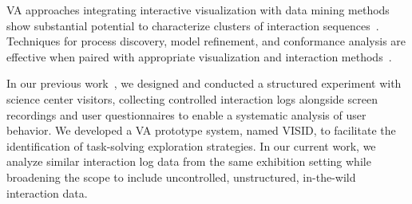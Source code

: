 \documentclass[preprint,journal]{vgtc}            %
\begin{document}
VA approaches integrating interactive visualization with data mining methods show substantial potential to characterize clusters of interaction sequences~\cite{Chen20ViSeq, Vrotsou09ActiviTree, Vrotsou19Exploratory, Yeshchenko22Visual}. 
Techniques for process discovery, model refinement, and conformance analysis are effective when paired with appropriate visualization and interaction methods~\cite{Sanne23Survey, Guo22Survey, Gschwandtner17Visual, Miksch24Visual}.

In our previous work~\cite{Yu25Revealing}, we designed and conducted a structured experiment with science center visitors, collecting controlled interaction logs alongside screen recordings and user questionnaires to enable a systematic analysis of user behavior.
We developed a VA prototype system, named VISID, to facilitate the identification of task-solving exploration strategies.
In our current work, we analyze similar interaction log data from the same exhibition setting while broadening the scope to include uncontrolled, unstructured, in-the-wild interaction data.
\end{document}
